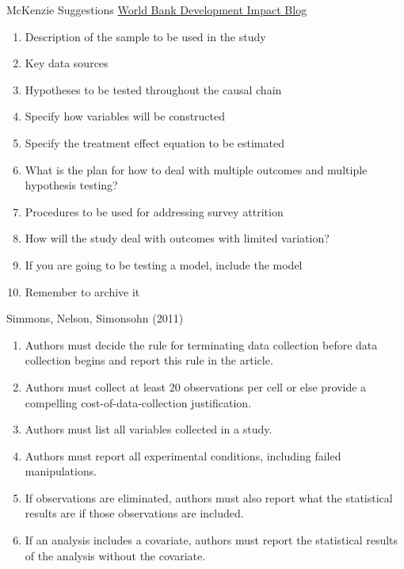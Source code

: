 \documentclass{beamer}
\begin{document}
\begin{frame}{McKenzie Suggestions}
\href{http://blogs.worldbank.org/impactevaluations/a-pre-analysis-plan-checklist}{World Bank Development Impact Blog}

\begin{enumerate}[<.->]
\item
  Description of the sample to be used in the study
\item
  Key data sources
\item
  Hypotheses to be tested throughout the causal chain
\item
  Specify how variables will be constructed
\item
  Specify the treatment effect equation to be estimated
\item
  What is the plan for how to deal with multiple outcomes and multiple
  hypothesis testing?
\item
  Procedures to be used for addressing survey attrition
\item
  How will the study deal with outcomes with limited variation?
\item
  If you are going to be testing a model, include the model
\item
  Remember to archive it
\end{enumerate}
\end{frame}

\begin{frame}{Simmons, Nelson, Simonsohn (2011)}
\begin{enumerate}[<.->]
\def\labelenumi{\arabic{enumi}.}
\item
  Authors must decide the rule for terminating data collection before
  data collection begins and report this rule in the article.
\item
  Authors must collect at least 20 observations per cell or else provide
  a compelling cost-of-data-collection justification.
\item
  Authors must list all variables collected in a study.
\item
  Authors must report all experimental conditions, including failed
  manipulations.
\item
  If observations are eliminated, authors must also report what the
  statistical results are if those observations are included.
\item
  If an analysis includes a covariate, authors must report the
  statistical results of the analysis without the covariate.
\end{enumerate}

\end{frame}
\end{document}
